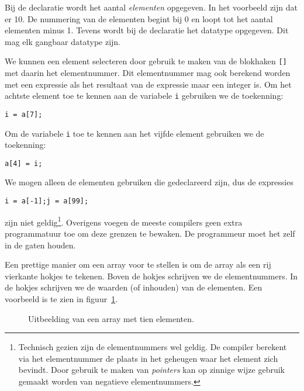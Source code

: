 Bij de declaratie wordt het aantal \textsl{elementen} opgegeven. In het voorbeeld zijn dat er 10. De nummering van de elementen begint bij 0 en loopt tot het aantal elementen minus 1. Tevens wordt bij de declaratie het datatype opgegeven. Dit mag elk gangbaar datatype zijn.

We kunnen een element selecteren door gebruik te maken van de blokhaken \texttt{[]}\indexop{[]} met daarin het elementnummer. Dit elementnummer mag ook berekend worden met een expressie als het resultaat van de expressie maar een integer is. Om het achtste element toe te kennen aan de variabele \texttt{i} gebruiken we de toekenning:

\hspace*{1em}\texttt{i = a[7];}

Om de variabele \texttt{i} toe te kennen aan het vijfde element gebruiken we de toekenning:

\hspace*{1em}\texttt{a[4] = i;}

We mogen alleen de elementen gebruiken die gedeclareerd zijn, dus de expressies

\hspace*{1em}\texttt{i = a[-1];}\quad\texttt{j = a[99];}

zijn niet geldig\footnote{Technisch gezien zijn de elementnummers wel geldig. De compiler berekent via het elementnummer de plaats in het geheugen waar het element zich bevindt. Door gebruik te maken van \textsl{pointers} kan op zinnige wijze gebruik gemaakt worden van negatieve elementnummers.}. Overigens voegen de meeste compilers geen extra programmatuur toe om deze grenzen te bewaken. De programmeur moet het zelf in de gaten houden.

Een prettige manier om een array voor te stellen is om de array als een rij vierkante hokjes te tekenen. Boven de hokjes schrijven we de elementnummers. In de hokjes schrijven we de waarden (of inhouden) van de elementen. Een voorbeeld is te zien in figuur~\ref{fig:arryinmem}.

\begin{figure}[!ht]
\centering
{}
\caption{Uitbeelding van een array met tien elementen.}
\label{fig:arryinmem}
\end{figure}

